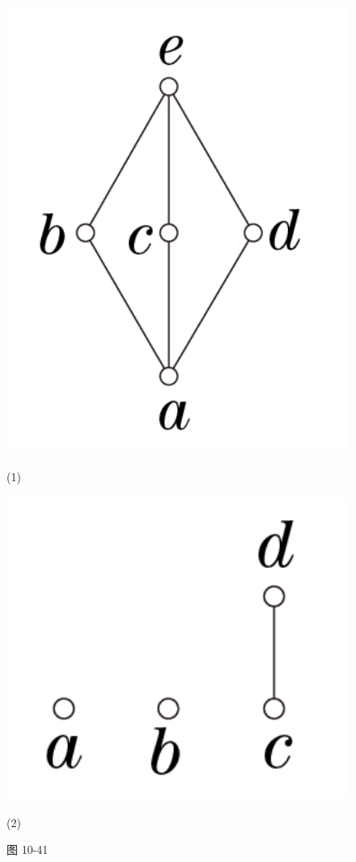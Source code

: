 \documentclass[UTF8]{ctexart}
\begin{document}
    \begin{figure}[!htb]
        \centering
        \begin{minipage}[t]{0.211\textwidth}
        \centering
        \includegraphics[width=1\textwidth]{10-41-1.png}
        \caption*{(1)}
        \end{minipage}
        \begin{minipage}[t]{0.183\textwidth}
        \centering
        \includegraphics[width=1\textwidth]{10-41-2.png}
        \caption*{(2)}
        \end{minipage}
        \caption*{图 10-41}
    \end{figure}
\end{document}
